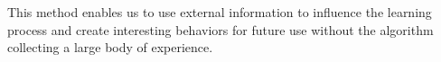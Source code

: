 \documentclass[addpoints,12pt,solution]{exam}
\begin{document}
\begin{questions}
\begin{solution}
            This method enables us to use external information to influence the learning process and create interesting
            behaviors for future use without the algorithm collecting a large body of experience.
        \end{solution}

    \end{questions}
\end{document}
